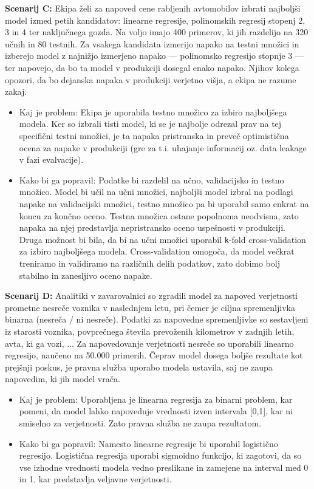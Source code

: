 \documentclass[12pt,a4paper]{article}
\begin{document}
\textbf{Scenarij C:} Ekipa želi za napoved cene rabljenih avtomobilov izbrati najboljši model izmed petih kandidatov: linearne regresije, polinomskih regresij stopenj 2, 3 in 4 ter naključnega gozda. Na voljo imajo 400 primerov, ki jih razdelijo na 320 učnih in 80 testnih. Za vsakega kandidata izmerijo napako na testni množici in izberejo model z najnižjo izmerjeno napako --- polinomsko regresijo stopnje 3 --- ter napovejo, da bo ta model v produkciji dosegal enako napako. Njihov kolega opozori, da bo dejanska napaka v produkciji verjetno višja, a ekipa ne razume zakaj.

\begin{itemize}
    \item Kaj je problem: Ekipa je uporabila testno množico za izbiro najboljšega modela. Ker so izbrali tisti model, ki se je najbolje odrezal prav na tej specifični testni množici, je ta napaka pristranska in preveč optimistična ocena za napake v produkciji (gre za t.i. uhajanje informacij oz. data leakage v fazi evalvacije).
    \item Kako bi ga popravil: Podatke bi razdelil na učno, validacijsko in testno množico. Model bi učil na učni množici, najboljši model izbral na podlagi napake na validacijski množici, testno množico pa bi uporabil samo enkrat na koncu za končno oceno. Testna množica ostane popolnoma neodvisna, zato napaka na njej predstavlja nepristransko oceno uspešnosti v produkciji. Druga možnost bi bila, da bi na učni množici uporabil \texttt{k}-fold cross-validation za izbiro najboljšega modela. Cross-validation omogoča, da model večkrat treniramo in validiramo na različnih delih podatkov, zato dobimo bolj stabilno in zanesljivo oceno napake.
\end{itemize}

\textbf{Scenarij D:} Analitiki v zavarovalnici so zgradili model za napoved verjetnosti prometne nesreče voznika v naslednjem letu, pri čemer je ciljna spremenljivka binarna (nesreča / ni nesreče). Podatki za napovedne spremenljivke so sestavljeni iz starosti voznika, povprečnega števila prevoženih kilometrov v zadnjih letih, avta, ki ga vozi, ... Za napovedovanje verjetnosti nesreče so uporabili linearno regresijo, naučeno na 50.000 primerih. Čeprav model dosega boljše rezultate kot prejšnji poskus, je pravna služba uporabo modela ustavila, saj ne zaupa napovedim, ki jih model vrača.

\begin{itemize}
    \item Kaj je problem: Uporabljena je linearna regresija za binarni problem, kar pomeni, da model lahko napoveduje vrednosti izven intervala [0,1], kar ni smiselno za verjetnosti. Zato pravna služba ne zaupa rezultatom.
    \item Kako bi ga popravil: Namesto linearne regresije bi uporabil logistično regresijo. Logistična regresija uporabi sigmoidno funkcijo, ki zagotovi, da so vse izhodne vrednosti modela vedno preslikane in zamejene na interval med 0 in 1, kar predstavlja veljavne verjetnosti.
\end{itemize}
\end{document}
